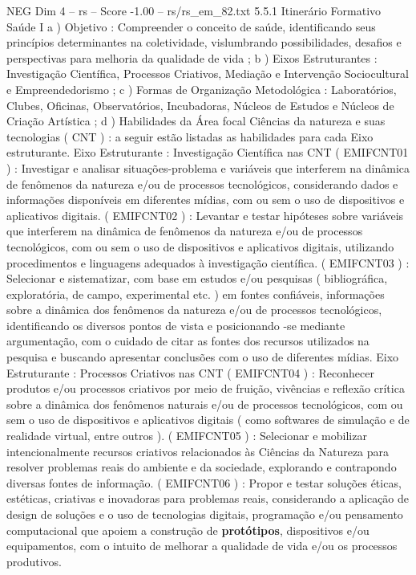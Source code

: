\begin{textsample}{NEG Dim 4 – rs – Score -1.00 – rs/rs\_em\_82.txt}  \label{ex:f4_neg_196}
5.5.1 Itinerário Formativo Saúde I a ) Objetivo : Compreender o conceito de saúde, identificando seus princípios determinantes na coletividade, vislumbrando possibilidades, desafios e perspectivas para melhoria da qualidade de vida ; b ) Eixos Estruturantes : Investigação Científica, Processos Criativos, Mediação e Intervenção Sociocultural e Empreendedorismo ; c ) Formas de Organização Metodológica : Laboratórios, Clubes, Oficinas, Observatórios, Incubadoras, Núcleos de Estudos e Núcleos de Criação Artística ; d ) Habilidades da Área focal Ciências da natureza e suas tecnologias ( CNT ) : a seguir estão listadas as habilidades para cada Eixo estruturante.
Eixo Estruturante : Investigação Científica nas CNT ( EMIFCNT01 ) : Investigar e analisar situações-problema e variáveis que interferem na dinâmica de fenômenos da natureza e/ou de processos tecnológicos, considerando dados e informações disponíveis em diferentes mídias, com ou sem o uso de dispositivos e aplicativos digitais. ( EMIFCNT02 ) : Levantar e testar hipóteses sobre variáveis que interferem na dinâmica de fenômenos da natureza e/ou de processos tecnológicos, com ou sem o uso de dispositivos e aplicativos digitais, utilizando procedimentos e linguagens adequados à investigação científica. ( EMIFCNT03 ) : Selecionar e sistematizar, com base em estudos e/ou pesquisas ( bibliográfica, exploratória, de campo, experimental etc. ) em fontes confiáveis, informações sobre a dinâmica dos fenômenos da natureza e/ou de processos tecnológicos, identificando os diversos pontos de vista e posicionando -se mediante argumentação, com o cuidado de citar as fontes dos recursos utilizados na pesquisa e buscando apresentar conclusões com o uso de diferentes mídias.
Eixo Estruturante : Processos Criativos nas CNT ( EMIFCNT04 ) : Reconhecer produtos e/ou processos criativos por meio de fruição, vivências e reflexão crítica sobre a dinâmica dos fenômenos naturais e/ou de processos tecnológicos, com ou sem o uso de dispositivos e aplicativos digitais ( como softwares de simulação e de realidade virtual, entre outros ). ( EMIFCNT05 ) : Selecionar e mobilizar intencionalmente recursos criativos relacionados às Ciências da Natureza para resolver problemas reais do ambiente e da sociedade, explorando e contrapondo diversas fontes de informação. ( EMIFCNT06 ) : Propor e testar soluções éticas, estéticas, criativas e inovadoras para problemas reais, considerando a aplicação de design de soluções e o uso de tecnologias digitais, programação e/ou pensamento computacional que apoiem a construção de \textbf{protótipos}, dispositivos e/ou equipamentos, com o intuito de melhorar a qualidade de vida e/ou os processos produtivos.

\end{textsample}
